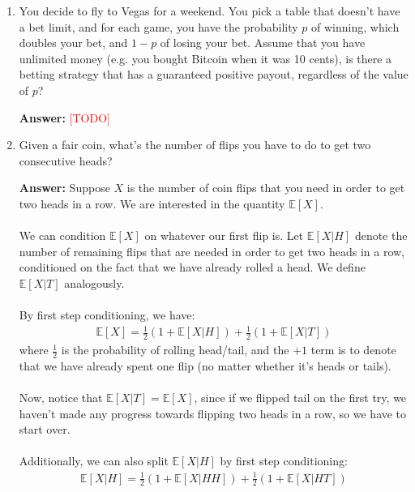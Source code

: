 \documentclass{article}
\newenvironment{QandA}{\begin{enumerate}[label=\arabic*.]}{\end{enumerate}}
\newenvironment{answer}{\par\normalfont \textbf{Answer:}}{}
\newcommand{\Exp}[1]{\mathbb{E}\left[ #1 \right]}
\newcommand{\g}{\vert}
\newcommand{\todo}{\textcolor{red}{[TODO]}}
\begin{document}
\begin{QandA}
\begin{answer}
        (Source: \href{https://en.wikipedia.org/wiki/Birthday_problem}{Wikipedia})
    \end{answer}

    \item You decide to fly to Vegas for a weekend. You pick a table that doesn't have a bet limit, and for each game, you have the probability $p$ of winning, which doubles your bet, and $1-p$ of losing your bet. Assume that you have unlimited money (e.g. you bought Bitcoin when it was 10 cents), is there a betting strategy that has a guaranteed positive payout, regardless of the value of $p$?
    \begin{answer}
        \todo
    \end{answer}
    
    \item Given a fair coin, what’s the number of flips you have to do to get two consecutive heads?
    \begin{answer}
        Suppose $X$ is the number of coin flips that you need in order to get two heads in a row. We are interested in the quantity $\Exp{X}$. \\\\
        We can condition $\Exp{X}$ on whatever our first flip is. Let $\Exp{X \g H}$ denote the number of remaining flips that are needed in order to get two heads in a row, conditioned on the fact that we have already rolled a head. We define $\Exp{X \g T}$ analogously. \\\\
        By first step conditioning, we have:
        \begin{align*}
            \Exp{X} = \frac{1}{2}\left( 1 + \Exp{X \g H} \right) + \frac{1}{2}\left( 1 + \Exp{X \g T} \right)
        \end{align*}
        where $\frac{1}{2}$ is the probability of rolling head/tail, and the $+ 1$ term is to denote that we have already spent one flip (no matter whether it's heads or tails). \\\\
        Now, notice that $\Exp{X \g T} = \Exp{X}$, since if we flipped tail on the first try, we haven't made any progress towards flipping two heads in a row, so we have to start over. \\\\
        Additionally, we can also split $\Exp{X \g H}$ by first step conditioning:
        \begin{align*}
            \Exp{X \g H} = \frac{1}{2} \left(1 + \Exp{X \g HH} \right) + \frac{1}{2} \left(1 + \Exp{X \g HT} \right)

\end{align*}
\end{answer}
\end{QandA}
\end{document}
